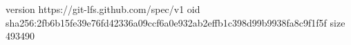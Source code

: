 version https://git-lfs.github.com/spec/v1
oid sha256:2fb6b15fe39e76fd42336a09ccf6a0e932ab2effb1c398d99b9938fa8c9f1f5f
size 493490
